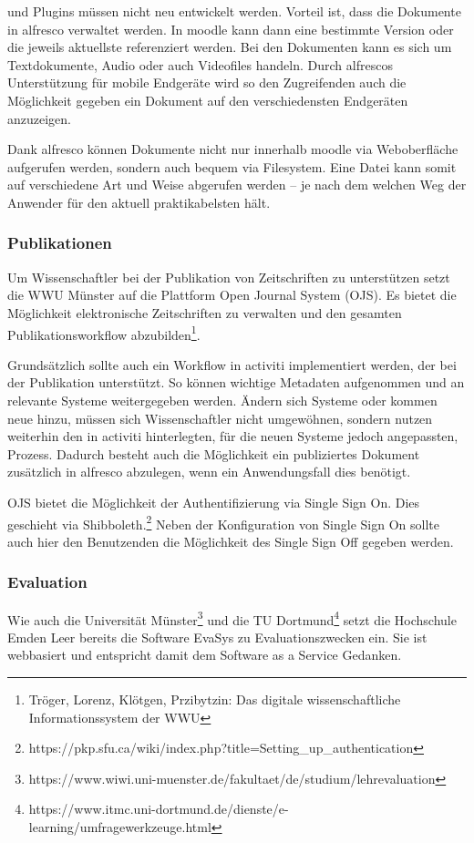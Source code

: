 \documentclass[a4paper]{article}
\begin{document}
und Plugins müssen nicht neu entwickelt werden. Vorteil ist, dass die Dokumente in alfresco verwaltet werden. In moodle
kann dann eine bestimmte Version oder die jeweils aktuellste referenziert werden. Bei den Dokumenten kann es sich um
Textdokumente, Audio oder auch Videofiles handeln. Durch alfrescos Unterstützung für mobile Endgeräte wird so den
Zugreifenden auch die Möglichkeit gegeben ein Dokument auf den verschiedensten Endgeräten anzuzeigen.

{\sffamily
Dank alfresco können Dokumente nicht nur innerhalb moodle via Weboberfläche aufgerufen werden, sondern auch bequem via
Filesystem. Eine Datei kann somit auf verschiedene Art und Weise abgerufen werden – je nach dem welchen Weg der
Anwender für den aktuell praktikabelsten hält.}

\subsubsection{Publikationen}
{\sffamily
Um Wissenschaftler bei der Publikation von Zeitschriften zu unterstützen setzt die WWU Münster auf die Plattform Open
Journal System (OJS). Es bietet die Möglichkeit elektronische Zeitschriften zu verwalten und den gesamten
Publikationsworkflow abzubilden\footnote{Tröger, Lorenz, Klötgen, Przibytzin: Das digitale wissenschaftliche
Informationssystem der WWU}.}

{\sffamily
Grundsätzlich sollte auch ein Workflow in activiti implementiert werden, der bei der Publikation unterstützt. So können
wichtige Metadaten aufgenommen und an relevante Systeme weitergegeben werden. Ändern sich Systeme oder kommen neue
hinzu, müssen sich Wissenschaftler nicht umgewöhnen, sondern nutzen weiterhin den in activiti hinterlegten, für die
neuen Systeme jedoch angepassten, Prozess. Dadurch besteht auch die Möglichkeit ein publiziertes Dokument zusätzlich in
alfresco abzulegen, wenn ein Anwendungsfall dies benötigt.}

{\sffamily
OJS bietet die Möglichkeit der Authentifizierung via Single Sign On. Dies geschieht via
Shibboleth.\footnote{https://pkp.sfu.ca/wiki/index.php?title=Setting\_up\_authentication} Neben der Konfiguration von
Single Sign On sollte auch hier den Benutzenden die Möglichkeit des Single Sign Off gegeben werden.}

\clearpage\subsubsection{Evaluation}
{\sffamily
Wie auch die Universität Münster\footnote{https://www.wiwi.uni-muenster.de/fakultaet/de/studium/lehrevaluation} und die
TU Dortmund\footnote{https://www.itmc.uni-dortmund.de/dienste/e-learning/umfragewerkzeuge.html} setzt die Hochschule
Emden Leer bereits die Software EvaSys zu Evaluationszwecken ein. Sie ist webbasiert und entspricht damit dem Software
as a Service Gedanken.}
\end{document}
